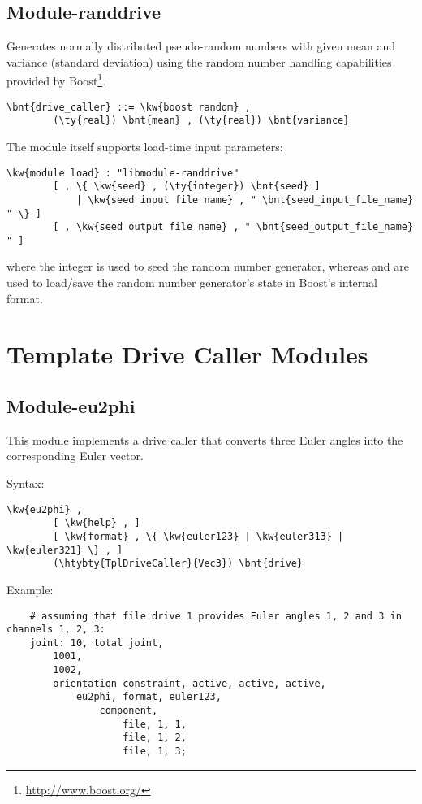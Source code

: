 \subsection{Module-randdrive}
Generates normally distributed pseudo-random numbers
with given mean and variance (standard deviation) using 
the random number handling capabilities
provided by Boost\footnote{\url{http://www.boost.org/}}.
\begin{Verbatim}[commandchars=\\\{\}]
    \bnt{drive_caller} ::= \kw{boost random} ,
        (\ty{real}) \bnt{mean} , (\ty{real}) \bnt{variance}
\end{Verbatim}
The module itself supports load-time input parameters:
\begin{Verbatim}[commandchars=\\\{\}]
    \kw{module load} : "libmodule-randdrive"
        [ , \{ \kw{seed} , (\ty{integer}) \bnt{seed} ]
            | \kw{seed input file name} , " \bnt{seed_input_file_name} " \} ]
        [ , \kw{seed output file name} , " \bnt{seed_output_file_name} " ]
\end{Verbatim}
where the integer  is used to seed the random number generator,
whereas  and 
are used to load/save the random number generator's state
in Boost's internal format.



\section{Template Drive Caller Modules}

\subsection{Module-eu2phi}
This module implements a  drive caller
that converts three Euler angles into the corresponding Euler vector.

Syntax:
\begin{Verbatim}[commandchars=\\\{\}]
    \kw{eu2phi} ,
        [ \kw{help} , ]
        [ \kw{format} , \{ \kw{euler123} | \kw{euler313} | \kw{euler321} \} , ]
        (\htybty{TplDriveCaller}{Vec3}) \bnt{drive}
\end{Verbatim}
Example:
\begin{verbatim}
    # assuming that file drive 1 provides Euler angles 1, 2 and 3 in channels 1, 2, 3:
    joint: 10, total joint,
        1001,
        1002,
        orientation constraint, active, active, active,
            eu2phi, format, euler123,
                component,
                    file, 1, 1,
                    file, 1, 2,
                    file, 1, 3;
\end{verbatim}


